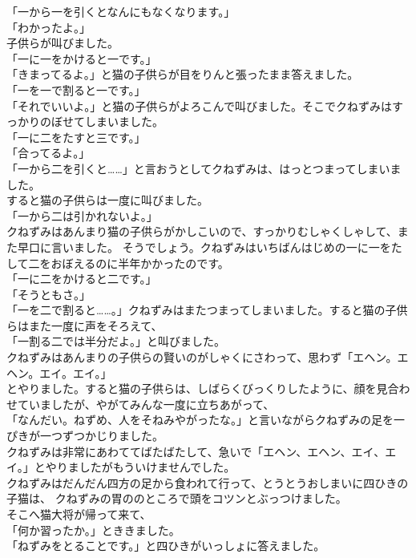 \documentclass[
a4paper,
10pt,
book]
{tarticle}
\begin{document}
「一から一を引くとなんにもなくなります。」\\
「わかったよ。」\\
\indent 子供らが叫びました。\\
「一に一をかけると一です。」\\
「きまってるよ。」と猫の子供らが目をりんと張ったまま答えました。\\
「一を一で割ると一です。」\\
「それでいいよ。」と猫の子供らがよろこんで叫びました。そこでクねずみはすっかりのぼせてしまいました。\\
「一に二をたすと三です。」\\
「合ってるよ。」\\
「一から二を引くと……」と言おうとしてクねずみは、はっとつまってしまいました。\\
\indent すると猫の子供らは一度に叫びました。\\
「一から二は引かれないよ。」\\
\indent クねずみはあんまり猫の子供らがかしこいので、すっかりむしゃくしゃして、また早口に言いました。
そうでしょう。クねずみはいちばんはじめの一に一をたして二をおぼえるのに半年かかったのです。\\
「一に二をかけると二です。」\\
「そうともさ。」\\
「一を二で割ると……。」クねずみはまたつまってしまいました。すると猫の子供らはまた一度に声をそろえて、\\
「一割る二では半分だよ。」と叫びました。\\
\indent クねずみはあんまりの子供らの賢いのがしゃくにさわって、思わず「エヘン。エヘン。エイ。エイ。」\\
とやりました。すると猫の子供らは、しばらくびっくりしたように、顔を見合わせていましたが、やがてみんな一度に立ちあがって、\\
「なんだい。ねずめ、人をそねみやがったな。」と言いながらクねずみの足を一ぴきが一つずつかじりました。\\
\indent クねずみは非常にあわててばたばたして、急いで「エヘン、エヘン、エイ、エイ。」とやりましたがもういけませんでした。\\
\indent クねずみはだんだん四方の足から食われて行って、とうとうおしまいに四ひきの子猫は、
クねずみの胃ののところで頭をコツンとぶっつけました。\\
\indent そこへ猫大将が帰って来て、\\
「何か習ったか。」とききました。\\
「ねずみをとることです。」と四ひきがいっしょに答えました。\\
\end{document}
